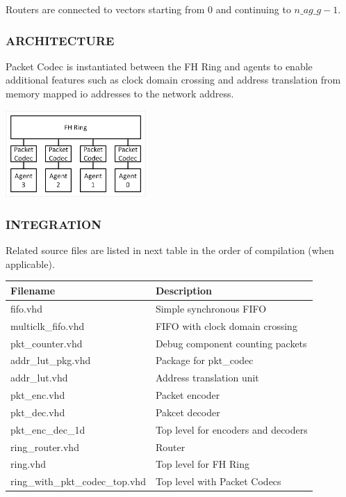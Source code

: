 \documentclass[a4paper,10pt,oneside,final]{article}
\def\deftablecolora{blue!10!white}
\def\deftablecolorb{white}
\begin{document}
Routers are connected to vectors starting from 0 and continuing to
$n\_ag\_g-1$.



\subsubsection{ARCHITECTURE}

 Packet Codec is instantiated between the FH Ring and agents to
 enable additional features such as clock domain crossing and address
 translation from memory mapped io addresses to the network address.

\begin{center}  
  \includegraphics[width=0.4\textwidth]{pic/architecture.png}
\end{center}

\subsubsection{INTEGRATION}

Related  source  files  are listed  in  next  table  in the  order  of
compilation (when applicable).

\begin{center}
  \rowcolors{3}{\deftablecolora}{\deftablecolorb}

  \label{tab:files}
  \begin{tabularx}{\textwidth}{|lX|}
    \hline
    Filename   & Description\\
    \hline
    fifo.vhd           & Simple synchronous FIFO\\
    multiclk\_fifo.vhd & FIFO with clock domain crossing\\
    pkt\_counter.vhd   & Debug component counting packets\\   
    addr\_lut\_pkg.vhd & Package for pkt\_codec\\
    addr\_lut.vhd      & Address translation unit\\
    pkt\_enc.vhd       & Packet encoder\\
    pkt\_dec.vhd       & Pakcet decoder\\
    pkt\_enc\_dec\_1d  & Top level for encoders and decoders\\        
    ring\_router.vhd   & Router\\
    ring.vhd           & Top level for FH Ring\\
    ring\_with\_pkt\_codec\_top.vhd & Top level with Packet Codecs\\
    \hline
  \end{tabularx}  
\end{center}
\end{document}
